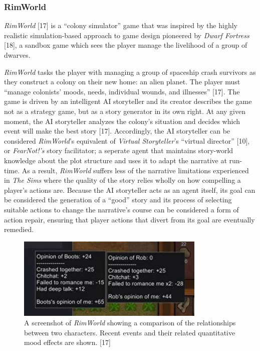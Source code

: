 \documentclass{sig-alternate-05-2015}
\begin{document}
\subsubsection{RimWorld}
\textit{RimWorld} [17] is a ``colony simulator'' game that was inspired by the highly realistic simulation-based approach to game design pioneered by \textit{Dwarf Fortress} [18], a sandbox game which sees the player manage the livelihood of a group of dwarves.

\textit{RimWorld} tasks the player with managing a group of spaceship crash survivors as they construct a colony on their new home: an alien planet. The player must ``manage colonists' moods, needs, individual wounds, and illnesses'' [17]. The game is driven by an intelligent AI storyteller and its creator describes the game not as a strategy game, but as a story generator in its own right. At any given moment, the AI storyteller analyzes the colony's situation and decides which event will make the best story [17]. Accordingly, the AI storyteller can be considered \textit{RimWorld}'s equivalent of \textit{Virtual Storyteller}'s ``virtual director'' [10], or \textit{FearNot!'s} story facilitator;  a seperate agent that maintains story-world knowledge about the plot structure and uses it to adapt the narrative at run-time. As a result, \textit{RimWorld} suffers less of the narrative limitations experienced in \textit{The Sims} where the quality of the story relies wholly on how compelling a player's actions are. Because the AI storyteller acts as an agent itself, its goal can be considered the generation of a ``good'' story and its process of selecting suitable actions to change the narrative's course can be considered a form of action repair, ensuring that player actions that divert from its goal are eventually remedied. 

\begin{figure}
\centering
\includegraphics[scale=0.68]{Images/rimworld.png}
\caption{A screenshot of \textit{RimWorld} showing a comparison of the relationships between two characters. Recent events and their related quantitative mood effects are shown. [17]}
\end{figure}
\end{document}
